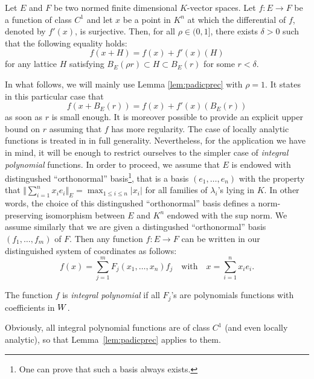 \documentclass{article}
\begin{document}
\begin{lem}
\label{lem:padicprec}
Let $E$ and $F$ be two normed finite dimensional $K$-vector spaces.
Let $f : E \to F$ be a function of class $C^1$ and let $x$
be a point in $K^n$ at which the differential of $f$, denoted by
$f'(x)$, is surjective.
Then, for all $\rho \in (0,1]$, there exists $\delta > 0$ such that
the following equality holds:
\begin{equation}
\label{eq:padicprec}
f(x + H) = f(x) + f'(x)(H)
\end{equation}
for any lattice $H$ satisfying $B_E(\rho r) \subset H \subset B_E(r)$
for some $r < \delta$.
\end{lem}

In what follows, we will mainly use Lemma \ref{lem:padicprec} with
$\rho = 1$. It states in this particular case that 
\begin{equation}
\label{eq:padicprec2}
f(x + B_E(r)) = f(x) + f'(x)(B_E(r))
\end{equation}
as soon as $r$ is small enough. It is moreover possible to provide
an explicit upper bound on $r$ assuming that $f$ has more regularity.
The case of locally analytic functions is treated in \cite{padicprec}
in full generality. Nevertheless, for the application we have in mind, 
it will be enough to restrict ourselves to the simpler case of 
\emph{integral polynomial} functions. In order to proceed, we assume 
that $E$ is endowed with distingushed ``orthonormal'' 
basis\footnote{One can prove that such a basis always exists.}, that is 
a basis $(e_1, \ldots, e_n)$ with the property that $\Vert \sum_{i=1}^n 
x_i e_i \Vert_E = \max_{1\leq i \leq n} |x_i|$ for all 
families of $\lambda_i$'s lying in $K$. In other words, the choice of
this distingushed ``orthonormal'' basis defines a norm-preserving 
isomorphism between $E$ and $K^n$ endowed with the sup norm. We assume
similarly that we are given a distingushed ``orthonormal'' basis
$(f_1, \ldots, f_m)$ of $F$. Then any function $f : E \to F$ can
be written in our distinguished system of coordinates as follows:
$$f(x) = \sum_{j=1}^m F_j(x_1, \ldots, x_n) f_j
\quad \text{with} \quad x = \sum_{i=1}^n x_i e_i.$$

\begin{deftn}
The function $f$ is \emph{integral polynomial} if all $F_j$'s are
polynomials functions with coefficients in $W$.
\end{deftn}

Obviously, all integral polynomial functions are of class $C^1$ (and
even locally analytic), so that Lemma~\ref{lem:padicprec} applies to 
them.
\end{document}
